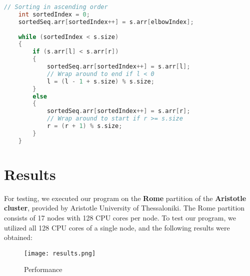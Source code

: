 \documentclass[12pt]{article}
\begin{document}
\vspace{0.3cm}
    \begin{lstlisting}[language=C]
    // Sorting in ascending order
    int sortedIndex = 0;
    sortedSeq.arr[sortedIndex++] = s.arr[elbowIndex];
    
    while (sortedIndex < s.size)
    {
        if (s.arr[l] < s.arr[r])
        {
            sortedSeq.arr[sortedIndex++] = s.arr[l];
            // Wrap around to end if l < 0
            l = (l - 1 + s.size) % s.size;
        }
        else
        {
            sortedSeq.arr[sortedIndex++] = s.arr[r];
            // Wrap around to start if r >= s.size
            r = (r + 1) % s.size;
        }
    }
\end{lstlisting}
\newpage
\section{Results}
For testing, we executed our program on the \textbf{Rome} partition of the \textbf{Aristotle cluster}, provided by Aristotle University of Thessaloniki. The Rome partition consists of 17 nodes with 128 CPU cores per node. To test our program, we utilized all 128 CPU cores of a single node, and the following results were obtained:

\begin{figure}[H]
    \centering
    \texttt{[image: results.png]}
    \caption{Performance}
    \label{fig:enter-label}
\end{figure}
\end{document}
